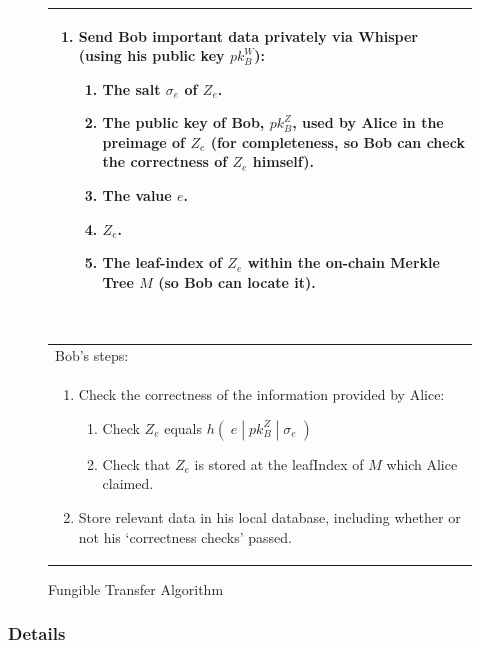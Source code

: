 \documentclass{article}
\newcounter{ongoingEnumCounter}%
\begin{document}
\begin{figure}[H]
\begin{center}
\begin{framed}
\begin{tabular}{p{16cm}}
\begin{enumerate}
          \item Send Bob important data privately via Whisper (using his public key $pk^W_B$):
          \begin{enumerate}
            \item The salt $\sigma_e$ of $Z_e$.
            \item The public key of Bob, $pk^Z_B$, used by Alice in the preimage of $Z_e$ (for completeness, so Bob can check the correctness of $Z_e$ himself).
            \item The value $e$.
            \item $Z_e$.
            \item The leaf-index of $Z_e$ within the on-chain Merkle Tree $M$ (so Bob can locate it).
          \end{enumerate}
          \setcounter{ongoingEnumCounter}{\value{enumi}}
        \end{enumerate}
        \ \\
        \hline
        Bob's steps:\\
        \begin{enumerate}
          \setcounter{enumi}{\value{ongoingEnumCounter}}
          \item Check the correctness of the information provided by Alice:
          \begin{enumerate}
            \item Check $Z_e$ equals $h(\;e\;|\;pk^Z_B\;|\;\sigma_e\;)$
            \item Check that $Z_e$ is stored at the leafIndex of $M$ which Alice claimed.
          \end{enumerate}
          \item Store relevant data in his local database, including whether or not his `correctness checks' passed.
          \setcounter{ongoingEnumCounter}{0} %
        \end{enumerate}
			\end{tabular}
		\end{framed}
	\end{center}
\caption{Fungible Transfer Algorithm} %
\end{figure}



\newpage
\subsubsection{Details}
\label{sec:721TransferDetails}
\end{document}

